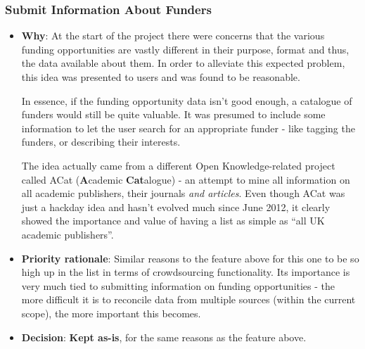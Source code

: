 \subsubsection{Submit Information About Funders}
\begin{itemize}
 \item \textbf{Why}: At the start of the project there were concerns that the various funding opportunities are vastly different in their purpose, format and thus, the data available about them. In order to alleviate this expected problem, this idea was presented to users and was found to be reasonable.
 
 In essence, if the funding opportunity data isn't good enough, a catalogue of funders would still be quite valuable. It was presumed to include some information to let the user search for an appropriate funder - like tagging the funders, or describing their interests.
 
 The idea actually came from a different Open Knowledge-related project called ACat (\textbf{A}cademic \textbf{Cat}alogue) \cite{acat} - an attempt to mine all information on all academic publishers, their journals \emph{and articles}. Even though ACat was just a hackday idea and hasn't evolved much since June 2012, it clearly showed the importance and value of having a list as simple as ``all UK academic publishers''.
 
 \item \textbf{Priority rationale}: Similar reasons to the feature above for this one to be so high up in the list in terms of crowdsourcing functionality. Its importance is very much tied to submitting information on funding opportunities - the more difficult it is to reconcile data from multiple sources (within the current scope), the more important this becomes.
 \item \textbf{Decision}: \textbf{Kept as-is}, for the same reasons as the feature above.
\end{itemize}

